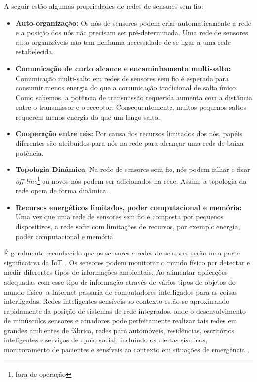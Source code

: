 A seguir estão algumas propriedades de redes de sensores sem fio:
\begin{itemize}
\item \textbf{Auto-organização:} Os nós de sensores podem criar automaticamente
a rede e a posição dos nós não precisam ser pré-determinada. Uma rede
de sensores auto-organizáveis não tem nenhuma necessidade de se ligar
a uma rede estabelecida.
\item \textbf{Comunicação de curto alcance e encaminhamento multi-salto:}
Comunicação multi-salto em redes de sensores sem fio é esperada para
consumir menos energia do que a comunicação tradicional de salto único.
Como sabemos, a potência de transmissão requerida aumenta com a distância
entre o transmissor e o receptor. Consequentemente, muitos pequenos
saltos requerem menos energia do que um longo salto.
\item \textbf{Cooperação entre nós:} Por causa dos recursos limitados dos
nós, papéis diferentes são atribuídos para nós na rede para alcançar
uma rede de baixa potência.
\item \textbf{Topologia Dinâmica:} Na rede de sensores sem fio, nós podem
falhar e ficar \emph{off-line}\footnote{fora de operação} ou novos
nós podem ser adicionados na rede. Assim, a topologia da rede opera
de forma dinâmica.
\item \textbf{Recursos energéticos limitados, poder computacional e memória:}
Uma vez que uma rede de sensores sem fio é composta por pequenos dispositivos,
a rede sofre com limitações de recursos, por exemplo energia, poder
computacional e memória.
\end{itemize}
É geralmente reconhecido que os sensores e redes de sensores serão
uma parte significativa da IoT \cite{Luckenbach2005}. Os sensores
podem monitorar o mundo físico por detectar e medir diferentes tipos
de informações ambientais. Ao alimentar aplicações adequadas com esse
tipo de informação através de vários tipos de objetos do mundo físico,
a Internet passaria de \textquotedbl{}computadores interligados\textquotedbl{}
para \textquotedbl{}as coisas interligadas.\textquotedbl{} Redes inteligentes
sensíveis ao contexto estão se aproximando rapidamente da posição
de sistemas de rede integrados, onde o desenvolvimento de minúsculos
sensores e atuadores pode perfeitamente realizar tais redes em grandes
ambientes de fábrica, redes para automóveis, residências, escritórios
inteligentes e serviços de apoio social, incluindo os alertas sísmicos,
monitoramento de pacientes e sensíveis ao contexto em situações de
emergência \cite{Luckenbach2005}.

